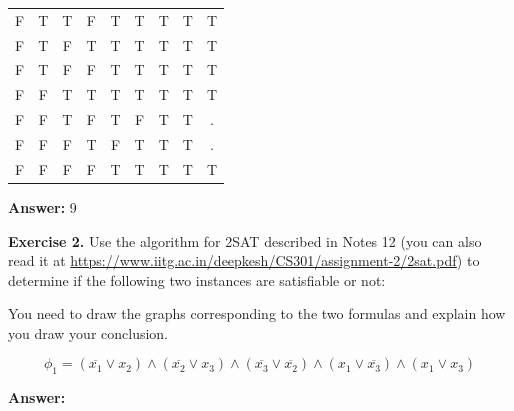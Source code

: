 \documentclass[11pt]{article}
\begin{document}
\begin{center}
\begin{tabular}{|c|c|c|c|c|c|c|c|c|}
    F   & T   & T   & F   & T                            & T                            & T                                        & T                                       & T      \\
    F   & T   & F   & T   & T                            & T                            & T                                        & T                                       & T      \\
    F   & T   & F   & F   & T                            & T                            & T                                        & T                                       & T      \\
    F   & F   & T   & T   & T                            & T                            & T                                        & T                                       & T      \\
    F   & F   & T   & F   & T                            & F                            & T                                        & T                                       & .      \\
    F   & F   & F   & T   & F                            & T                            & T                                        & T                                       & .      \\
    F   & F   & F   & F   & T                            & T                            & T                                        & T                                       & T      \\
    \hline
  \end{tabular}
\end{center}

\textbf{Answer:} 9
\bigskip

\textbf{Exercise 2.}  Use the algorithm for 2SAT described in Notes 12 (you can also read it  at \url{https://www.iitg.ac.in/deepkesh/CS301/assignment-2/2sat.pdf})    to determine if the following  two instances are satisfiable or not:

You need to draw the graphs corresponding to the two formulas and explain how you draw your conclusion.

\[
  \phi_1 = (\overline{x_1} \vee x_2) \wedge   (\overline{x_2}  \vee x_3) \wedge  (\overline{x_3} \vee \overline{x_2}) \wedge  (x_1 \vee \overline{x_3}) \wedge  (x_1 \vee x_3)
\]

\textbf{Answer:}
\end{document}
